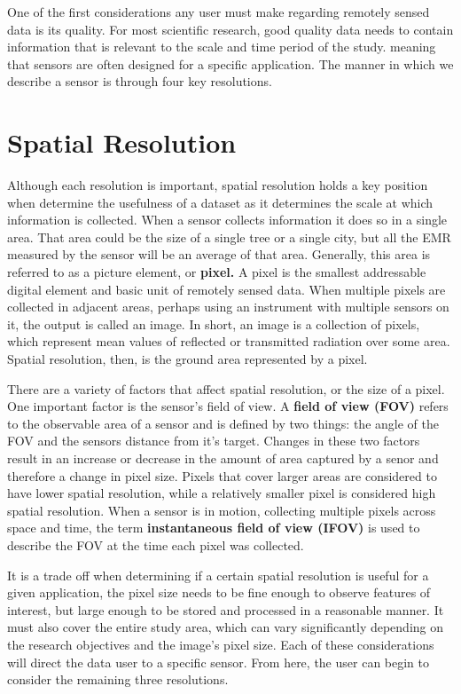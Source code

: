 \documentclass[
]{book}
\begin{document}
One of the first considerations any user must make regarding remotely sensed data is its quality. For most scientific research, good quality data needs to contain information that is relevant to the scale and time period of the study. meaning that sensors are often designed for a specific application. The manner in which we describe a sensor is through four key resolutions.

\section{Spatial Resolution}\label{spatial-resolution}

Although each resolution is important, spatial resolution holds a key position when determine the usefulness of a dataset as it determines the scale at which information is collected. When a sensor collects information it does so in a single area. That area could be the size of a single tree or a single city, but all the EMR measured by the sensor will be an average of that area. Generally, this area is referred to as a picture element, or \textbf{pixel.} A pixel is the smallest addressable digital element and basic unit of remotely sensed data. When multiple pixels are collected in adjacent areas, perhaps using an instrument with multiple sensors on it, the output is called an image. In short, an image is a collection of pixels, which represent mean values of reflected or transmitted radiation over some area. Spatial resolution, then, is the ground area represented by a pixel.

There are a variety of factors that affect spatial resolution, or the
size of a pixel. One important factor is the sensor's field of view. A \textbf{field of view (FOV)} refers to the observable area of a sensor and is defined by two things: the angle of the FOV and the sensors distance from it's target. Changes in these two factors result in an increase or decrease in the amount of area captured by a senor and therefore a change in pixel size. Pixels that cover larger areas are considered to have lower spatial resolution, while a relatively smaller pixel is considered high spatial resolution. When a sensor is in motion, collecting multiple pixels across space and time, the term \textbf{instantaneous field of view (IFOV)} is used to describe the FOV at the time each pixel was collected.

It is a trade off when determining if a certain spatial resolution is useful for a given application, the pixel size needs to be fine enough to observe features of interest, but large enough to be stored and processed in a reasonable manner. It must also cover the entire study area, which can vary significantly depending on the research objectives and the image's pixel size. Each of these considerations will direct the data user to a specific sensor. From here, the user can begin to consider the remaining three resolutions.
\end{document}
